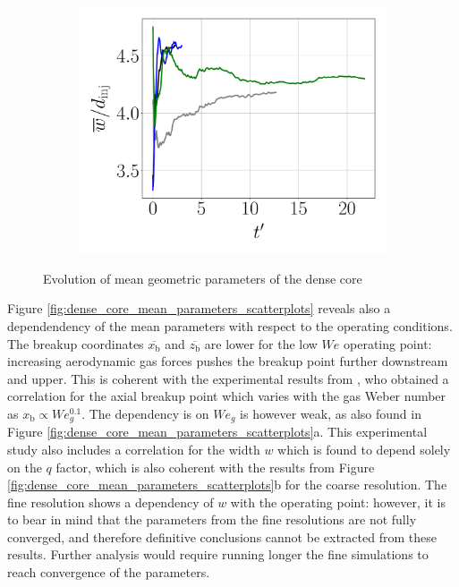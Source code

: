 \begin{figure}[ht]
\hfill
\begin{subfigure}[b]{0.3\textwidth}
	\flushleft
   \includegraphics[scale=0.225]{./part2_developments/figures_ch5_resolved_JICF/results_dense_core_modeling/convergence_mean_width}
\end{subfigure}
   \caption{Evolution of mean geometric parameters of the dense core}
\label{fig:dense_core_mean_parameters_convergence}
\end{figure}

Figure \ref{fig:dense_core_mean_parameters_scatterplots} reveals also a dependendency of the mean parameters with respect to the operating conditions. The breakup coordinates $\overline{x_\mathrm{b}}$ and $\overline{z_\mathrm{b}}$ are lower for the low $We$ operating point: increasing aerodynamic gas forces pushes the breakup point further downstream and upper. This is coherent with the experimental results from , who obtained a correlation for the axial breakup point which varies with the gas Weber number as $x_\mathrm{b} \propto We_g^{0.1}$. The dependency is on $We_g$ is however weak, as also found in Figure \ref{fig:dense_core_mean_parameters_scatterplots}a. This experimental study also includes a correlation for the width $w$ which is found to depend solely on the $q$ factor, which is also coherent with the results from Figure \ref{fig:dense_core_mean_parameters_scatterplots}b for the coarse resolution. The fine resolution shows a dependency of $w$ with the operating point: however, it is to bear in mind that the parameters from the fine resolutions are not fully converged, and therefore definitive conclusions cannot be extracted from these results. Further analysis would require running longer the fine simulations to reach convergence of the parameters. 


